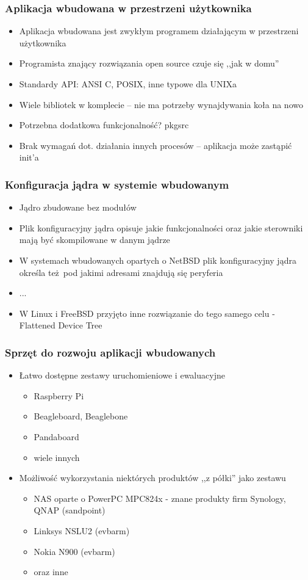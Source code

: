 \documentclass[dvipsnames,table]{beamer}
\begin{document}
\begin{frame}
\frametitle{Aplikacja wbudowana w przestrzeni użytkownika}
\begin{itemize}
	\item Aplikacja wbudowana jest zwykłym programem działającym w przestrzeni użytkownika
	\item Programista znający rozwiązania open source czuje się ,,jak w domu''
	\item Standardy API: ANSI C, POSIX, inne typowe dla UNIXa
	\item Wiele bibliotek w komplecie -- nie ma potrzeby wynajdywania koła na nowo
	\item Potrzebna dodatkowa funkcjonalność? pkgsrc
	\item Brak wymagań dot. działania innych procesów -- aplikacja może zastąpić init'a
\end{itemize}
\end{frame}

\begin{frame}
\frametitle{Konfiguracja jądra w systemie wbudowanym}
\begin{itemize}
	\item Jądro zbudowane bez modułów
	\item Plik konfiguracyjny jądra opisuje jakie funkcjonalności oraz jakie sterowniki mają być skompilowane w danym jądrze
	\item W systemach wbudowanych opartych o NetBSD plik konfiguracyjny jądra określa też pod jakimi adresami znajdują się peryferia
	\item ...
	\item W Linux i FreeBSD przyjęto inne rozwiązanie do tego samego celu - Flattened Device Tree
\end{itemize}
\end{frame}




\begin{frame}
\frametitle{Sprzęt do rozwoju aplikacji wbudowanych}
\begin{itemize}
	\item Łatwo dostępne zestawy uruchomieniowe i ewaluacyjne
	\begin{itemize}
		\item Raspberry Pi
		\item Beagleboard, Beaglebone
		\item Pandaboard
		\item wiele innych

	\end{itemize}
	\item Możliwość wykorzystania niektórych produktów ,,z półki'' jako zestawu
	\begin{itemize}
		\item NAS oparte o PowerPC MPC824x - znane produkty firm Synology, QNAP (sandpoint)
		\item Linksys NSLU2 (evbarm)
		\item Nokia N900 (evbarm)
		\item oraz inne
	\end{itemize}
\end{itemize}
\end{frame}
\end{document}
